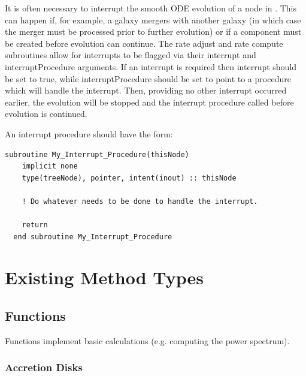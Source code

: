 It is often necessary to interrupt the smooth ODE evolution of a node in \glc. This can happen if, for example, a galaxy mergers with another galaxy (in which case the merger must be processed prior to further evolution) or if a component must be created before evolution can continue. The rate adjust and rate compute subroutines allow for interrupts to be flagged via their {\normalfont \ttfamily interrupt} and {\normalfont \ttfamily interruptProcedure} arguments. If an interrupt is required then {\normalfont \ttfamily interrupt} should be set to true, while {\normalfont \ttfamily interruptProcedure} should be set to point to a procedure which will handle the interrupt. Then, providing no other interrupt occurred earlier, the evolution will be stopped and the interrupt procedure called before evolution is continued.

An interrupt procedure should have the form:
\begin{lstlisting}[escapechar=@,breaklines,prebreak=\&,postbreak=\&]
  subroutine My_Interrupt_Procedure(thisNode)
    implicit none
    type(treeNode), pointer, intent(inout) :: thisNode
  
    ! Do whatever needs to be done to handle the interrupt.

    return
  end subroutine My_Interrupt_Procedure
\end{lstlisting}

\section{Existing Method Types}

\subsection{Functions}

Functions implement basic calculations (e.g. computing the power spectrum).


\subsubsection{Accretion Disks}\label{sec:AccretionDisks}

